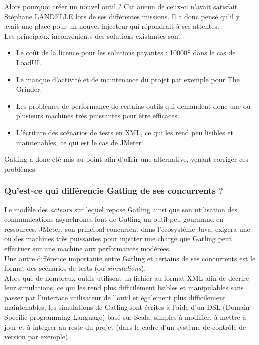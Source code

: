 Alors pourquoi créer un nouvel outil ? Car aucun de ceux-ci n'avait satisfait Stéphane LANDELLE lors de ses différentes missions. Il a donc pensé qu'il y avait une place pour un nouvel injecteur qui répondrait à ses attentes.\\

Les principaux inconvénients des solutions existantes sont :

\begin{itemize}
	\item Le coût de la licence pour les solutions payantes : 10000\$ dans le cas de LoadUI.
	\item Le manque d'activité et de maintenance du projet par exemple pour The Grinder. 
	\item Les problèmes de performance de certains outils qui demandent donc une ou plusieurs machines très puissantes pour être efficaces. 
	\item L'écriture des scénarios de tests en XML, ce qui les rend peu lisibles et maintenables, ce qui est le cas de JMeter.\\
\end{itemize}

Gatling a donc été mis au point afin d'offrir une alternative, venant corriger ces problèmes.

\subsubsection*{Qu'est-ce qui différencie Gatling de ses concurrents ?}

Le modèle des \textit{acteurs} sur lequel repose Gatling ainsi que son utilisation des communications asynchrones font de Gatling un outil peu gourmand en ressources.
JMeter, son principal concurrent dans l'écosystème Java, exigera une ou des machines très puissantes pour injecter une charge que Gatling peut effectuer sur une machine aux performances modérées.\\

Une autre différence importante entre Gatling et certains de ses concurrents est le format des scénarios de tests (ou \textit{simulations}).\\
Alors que de nombreux outils utilisent un fichier au format XML afin de décrire leur simulations, ce qui les rend plus difficilement lisibles et manipulables sans passer par l'interface utilisateur de l'outil et également plus difficilement maintenables, les simulations de Gatling sont écrites à l'aide d'un DSL (Domain-Specific programming Language) basé sur Scala, simples à modifier, à mettre à jour et à intégrer au reste du projet (dans le cadre d'un système de contrôle de version par exemple).

